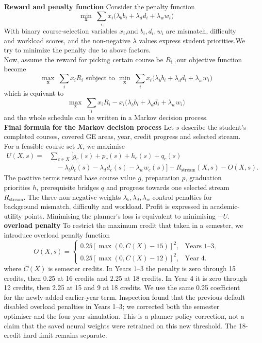 \documentclass{article}
\begin{document}
\newpage
\textbf{Reward and penalty function } 
Consider the penalty function 
\[
  \min_{\mathbf{x}}\;\sum_i x_i
  \bigl(\lambda_b b_i+\lambda_d d_i+\lambda_w w_i\bigr)
 \]
With binary course-selection variables $x_i$,and $b_i,d_i,w_i$ are mismatch, difficulty and workload scores, and the non-negative $\lambda$ values express student priorities.We try to minimize the penalty due to above factors.\\
Now, assume the reward for picking certain course be $R_i$ ,our objective function become 
\[\max_{\mathbf{x}}\;\sum_i x_iR_i \text{ subject to }\min_{\mathbf{x}}\;\sum_i x_i
  \bigl(\lambda_b b_i+\lambda_d d_i+\lambda_w w_i\bigr)\]
which is equivant to
\[\max_{\mathbf{x}}\;\sum_i x_iR_i  -x_i
  \bigl(\lambda_b b_i+\lambda_d d_i+\lambda_w w_i\bigr)\]
and the whole schedule can be written in a Markov decision process.\\
\textbf{Final formula for the Markov decision process}
Let $s$ describe the student's completed courses, covered GE areas, year, credit progress and selected stream. For a feasible course set $X$, we maximise
\begin{align}
U(X,s)={}&\sum_{c\in X}\bigl[g_c(s)+p_c(s)+h_c(s)+q_c(s)\nonumber\\
&\quad-\lambda_b b_c(s)-\lambda_d d_c(s)-\lambda_w w_c(s)\bigr]
+R_{\mathrm{stream}}(X,s)-O(X,s). \label{eq:utility}
\end{align}
The positive terms reward base course value $g$, preparation $p$, graduation priorities $h$, prerequisite bridges $q$ and progress towards one selected stream $R_{\mathrm{stream}}$. The three non-negative weights $\lambda_b,\lambda_d,\lambda_w$ control penalties for background mismatch, difficulty and workload. Profit is expressed in academic-utility points. Minimising the planner's loss is equivalent to minimising $-U$.
\\\textbf{overload penalty} To restrict the maximum credit that taken in a semester, we introduce overload penalty function
\begin{equation}
O(X,s)=\begin{cases}
0.25[\max(0,C(X)-15)]^2,&\text{Years 1--3},\\
0.25[\max(0,C(X)-12)]^2,&\text{Year 4}.
\end{cases}
\end{equation}
where $C(X)$ is semester credits. In Years 1--3 the penalty is zero through 15 credits, then 0.25 at 16 credits and 2.25 at 18 credits. In Year 4 it is zero through 12 credits, then 2.25 at 15 and 9 at 18 credits. We use the same 0.25 coefficient for the newly added earlier-year term. Inspection found that the previous default disabled overload penalties in Years 1--3; we corrected both the semester optimiser and the four-year simulation. This is a planner-policy correction, not a claim that the saved neural weights were retrained on this new threshold. The 18-credit hard limit remains separate.
\end{document}
